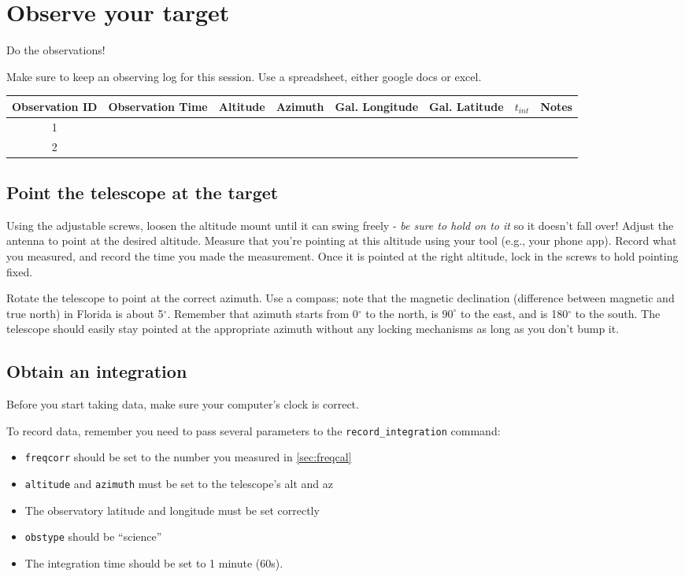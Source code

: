 \documentclass[11pt]{article}
\begin{document}
\clearpage
\section{Observe your target}
\label{sec:observe}

\par Do the observations!

Make sure to keep an observing log for this session.  Use a spreadsheet, either google docs or excel.

\begin{tabular}{|c|c|c|c|c|c|c|c|}
\hline
Observation ID & Observation Time & Altitude & Azimuth &  Gal. Longitude & Gal. Latitude  & $t_{int}$ & Notes \\
\hline
 1  & & & & & & & \\
 \hline
 2  & & & & & & & \\
 \hline
\end{tabular}

\subsection{Point the telescope at the target}
\label{sec:point}
Using the adjustable screws, loosen the altitude mount until it can swing freely - \emph{be sure to hold on to it} so it doesn't fall over!
Adjust the antenna to point at the desired altitude.
Measure that you're pointing at this altitude using your tool (e.g., your phone app).
Record what you measured, and record the time you made the measurement.
Once it is pointed at the right altitude, lock in the screws to hold pointing fixed.

Rotate the telescope to point at the correct azimuth.
Use a compass; note that the magnetic declination (difference between magnetic
and true north) in Florida is about 5$^\circ$.
Remember that azimuth starts from 0$^\circ$ to the north, is $90^\circ$ to the east,
and is 180$^\circ$ to the south.
The telescope should easily stay pointed at the appropriate azimuth without
any locking mechanisms as long as you don't bump it.


\subsection{Obtain an integration}
\label{sec:integrate}
Before you start taking data, make sure your computer's clock is correct.

To record data, remember you need to pass several parameters to the \verb|record_integration| command:
\begin{itemize}
    \item \verb|freqcorr| should be set to the number you measured in \ref{sec:freqcal}
    \item \verb|altitude| and \verb|azimuth| must be set to the telescope's alt and az
    \item The observatory latitude and longitude must be set correctly
    \item \verb|obstype| should be ``science''
    \item The integration time should be set to 1 minute (60s).
\end{itemize}
\end{document}
